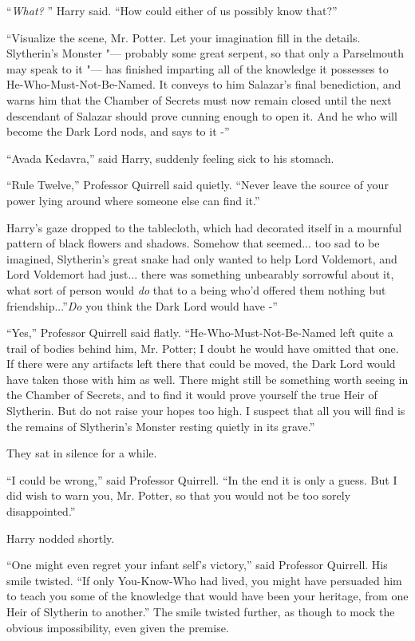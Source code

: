 ``\emph{What?} '' Harry said. ``How could either of us possibly know
that?''

``Visualize the scene, Mr. Potter. Let your imagination fill in the
details. Slytherin's Monster "--- probably some great serpent, so that only
a Parselmouth may speak to it "--- has finished imparting all of the
knowledge it possesses to He-Who-Must-Not-Be-Named. It conveys to him
Salazar's final benediction, and warns him that the Chamber of Secrets
must now remain closed until the next descendant of Salazar should prove
cunning enough to open it. And he who will become the Dark Lord nods,
and says to it -''

``Avada Kedavra,'' said Harry, suddenly feeling sick to his stomach.

``Rule Twelve,'' Professor Quirrell said quietly. ``Never leave the
source of your power lying around where someone else can find it.''

Harry's gaze dropped to the tablecloth, which had decorated itself in a
mournful pattern of black flowers and shadows. Somehow that
seemed... too sad to be imagined, Slytherin's great snake had only
wanted to help Lord Voldemort, and Lord Voldemort had just... there
was something unbearably sorrowful about it, what sort of person would
\emph{do} that to a being who'd offered them nothing but
friendship...''\emph{Do} you think the Dark Lord would have -''

``Yes,'' Professor Quirrell said flatly. ``He-Who-Must-Not-Be-Named left
quite a trail of bodies behind him, Mr. Potter; I doubt he would have
omitted that one. If there were any artifacts left there that could be
moved, the Dark Lord would have taken those with him as well. There
might still be something worth seeing in the Chamber of Secrets, and to
find it would prove yourself the true Heir of Slytherin. But do not
raise your hopes too high. I suspect that all you will find is the
remains of Slytherin's Monster resting quietly in its grave.''

They sat in silence for a while.

``I could be wrong,'' said Professor Quirrell. ``In the end it is only a
guess. But I did wish to warn you, Mr. Potter, so that you would not be
too sorely disappointed.''

Harry nodded shortly.

``One might even regret your infant self's victory,'' said Professor
Quirrell. His smile twisted. ``If only You-Know-Who had lived, you might
have persuaded him to teach you some of the knowledge that would have
been your heritage, from one Heir of Slytherin to another.'' The smile
twisted further, as though to mock the obvious impossibility, even given
the premise.

